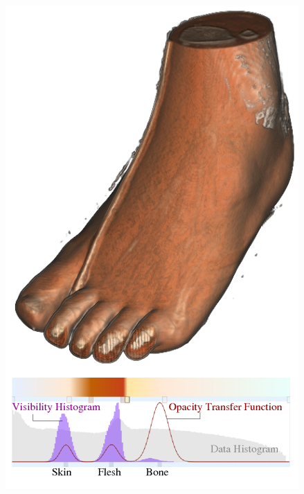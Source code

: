 \begin{figure}
\centering
\begin{minipage}{.49\textwidth}
\includegraphics[width=1\linewidth]{images/correa_visibility-driven_2009_a}
\end{minipage}~
\begin{minipage}{.49\textwidth}

\end{minipage}
\end{figure}
